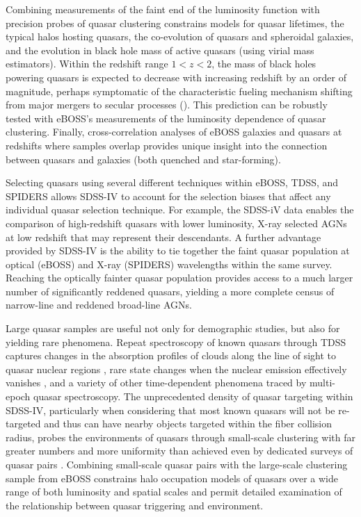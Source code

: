 Combining measurements of the faint end of the luminosity function
with precision probes of quasar clustering constrains models for
quasar lifetimes, the typical halos hosting quasars, the co-evolution
of quasars and spheroidal galaxies, and the evolution in black hole
mass of active quasars (using virial mass estimators). Within the
redshift range $1<z<2$, the mass of black holes powering quasars is
expected to decrease with increasing redshift by an order of
magnitude, perhaps symptomatic of the characteristic fueling mechanism
shifting from major mergers to secular processes
(\citealt{hopkinshernquist06}). This prediction can be robustly tested
with eBOSS's measurements of the luminosity dependence of quasar
clustering. Finally, cross-correlation analyses of eBOSS galaxies and
quasars at redshifts where samples overlap provides unique insight
into the connection between quasars and galaxies (both quenched and
star-forming).

Selecting quasars using several different techniques within eBOSS,
TDSS, and SPIDERS allows SDSS-IV to account for the selection biases
that affect any individual quasar selection technique.  For example,
the SDSS-iV data enables the comparison of high-redshift quasars
with lower luminosity, X-ray selected AGNs at low redshift that may
represent their descendants.  A further advantage provided by SDSS-IV
is the ability to tie together the faint quasar population at optical
(eBOSS) and X-ray (SPIDERS) wavelengths within the same
survey. Reaching the optically fainter quasar population provides
access to a much larger number of significantly reddened quasars,
yielding a more complete census of narrow-line and reddened broad-line
AGNs.

Large quasar samples are useful not only for demographic studies, but
also for yielding rare phenomena. Repeat spectroscopy of known quasars
through TDSS captures changes in the absorption profiles of clouds
along the line of sight to quasar nuclear
regions \citep[e.g.,][]{ak13a}, rare state changes when the nuclear
emission effectively vanishes \citep[so-called ``changing-look''
quasars;][]{lamassa15a,runnoe16a}, and a variety of other
time-dependent phenomena traced by multi-epoch quasar
spectroscopy. The unprecedented density of quasar targeting
within SDSS-IV, particularly when considering that most known quasars
will not be re-targeted and thus can have nearby objects targeted
within the fiber collision radius, probes the environments of
quasars through small-scale clustering with far greater numbers and
more uniformity than achieved even by dedicated surveys of quasar
pairs \citep[e.g.,][]{hennawi06a}.  Combining small-scale quasar pairs
with the large-scale clustering sample from eBOSS constrains halo
occupation models of quasars over a wide range of both luminosity and
spatial scales and permit detailed examination of the relationship
between quasar triggering and environment.

